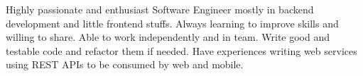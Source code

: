 \begin{cvparagraph}


    Highly passionate and enthusiast Software Engineer mostly in backend development and little frontend stuffs. 
    Always learning to improve skills and willing to share. 
    Able to work independently and in team. 
    Write good and testable code and refactor them if needed. 
    Have experiences writing web services using REST APIs to be consumed by web and mobile.
\end{cvparagraph}